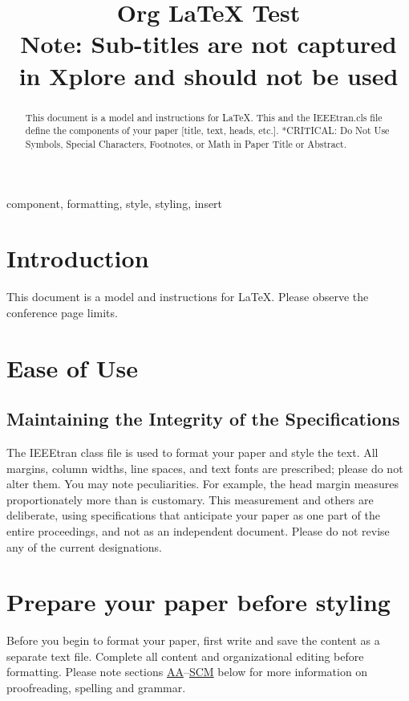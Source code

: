 \documentclass[conference]{IEEEtran}
\date{}
\title{Org \LaTeX{} Test\\\medskip
\large *Note: Sub-titles are not captured in Xplore and should not be used}
\begin{document}
\maketitle
\begin{abstract}
This document is a model and instructions for \LaTeX. This and the IEEEtran.cls file define the components of your paper [title, text, heads, etc.]. *CRITICAL: Do Not Use Symbols, Special Characters, Footnotes, or Math in Paper Title or Abstract.
\end{abstract}

 \begin{IEEEkeywords}
component, formatting, style, styling, insert
 \end{IEEEkeywords}

\section{Introduction}
\label{sec:orgcffa6f0}
This document is a model and instructions for \LaTeX{}. Please observe the conference page limits.

\section{Ease of Use}
\label{sec:org3567c63}
\subsection{Maintaining the Integrity of the Specifications}
\label{sec:orgf86e499}
   The IEEEtran class file is used to format your paper and style the text. All margins, column widths, line spaces, and text fonts are prescribed; please do not alter them. You may note peculiarities. For example, the head margin
measures proportionately more than is customary. This measurement and others are deliberate, using specifications that anticipate your paper as one part of the entire proceedings, and not as an independent document. Please do not revise any of the current designations.

\section{Prepare your paper before styling}
\label{sec:org186c4c4}
Before you begin to format your paper, first write and save the content as a separate text file. Complete all content and organizational editing before formatting. Please note sections \hyperref[sec:org78c92c2]{AA}--\hyperref[sec:org8ba0765]{SCM} below for more information on proofreading, spelling and grammar.
\end{document}
